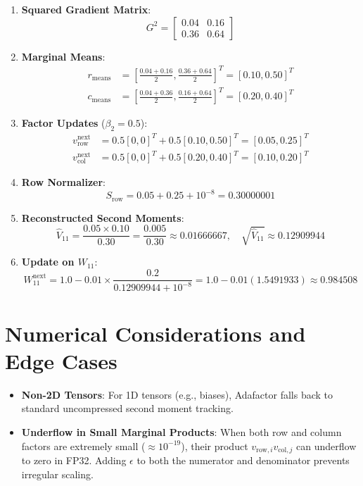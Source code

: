 \documentclass[11pt,a4paper]{article}
\theoremstyle{definition}
\begin{document}
\begin{enumerate}
    \item \textbf{Squared Gradient Matrix}:
    \begin{equation}
    G^2 = \begin{bmatrix} 0.04 & 0.16 \\ 0.36 & 0.64 \end{bmatrix}
    \end{equation}
    \item \textbf{Marginal Means}:
    \begin{align}
    r_{\text{means}} &= \left[ \frac{0.04 + 0.16}{2}, \frac{0.36 + 0.64}{2} \right]^T = [0.10, 0.50]^T \\
    c_{\text{means}} &= \left[ \frac{0.04 + 0.36}{2}, \frac{0.16 + 0.64}{2} \right]^T = [0.20, 0.40]^T
    \end{align}
    \item \textbf{Factor Updates} ($\beta_2 = 0.5$):
    \begin{align}
    v_{\text{row}}^{\text{next}} &= 0.5[0, 0]^T + 0.5[0.10, 0.50]^T = [0.05, 0.25]^T \\
    v_{\text{col}}^{\text{next}} &= 0.5[0, 0]^T + 0.5[0.20, 0.40]^T = [0.10, 0.20]^T
    \end{align}
    \item \textbf{Row Normalizer}:
    \begin{equation}
    S_{\text{row}} = 0.05 + 0.25 + 10^{-8} = 0.30000001
    \end{equation}
    \item \textbf{Reconstructed Second Moments}:
    \begin{equation}
    \hat{V}_{11} = \frac{0.05 \times 0.10}{0.30} = \frac{0.005}{0.30} \approx 0.01666667, \quad \sqrt{\hat{V}_{11}} \approx 0.12909944
    \end{equation}
    \item \textbf{Update on $W_{11}$}:
    \begin{equation}
    W_{11}^{\text{next}} = 1.0 - 0.01 \times \frac{0.2}{0.12909944 + 10^{-8}} = 1.0 - 0.01(1.5491933) \approx 0.984508
    \end{equation}
\end{enumerate}

\section{Numerical Considerations and Edge Cases}

\begin{itemize}
    \item \textbf{Non-2D Tensors}: For 1D tensors (e.g., biases), Adafactor falls back to standard uncompressed second moment tracking.
    \item \textbf{Underflow in Small Marginal Products}: When both row and column factors are extremely small ($\approx 10^{-19}$), their product $v_{\text{row}, i} v_{\text{col}, j}$ can underflow to zero in FP32. Adding $\epsilon$ to both the numerator and denominator prevents irregular scaling.
\end{itemize}
\end{document}
